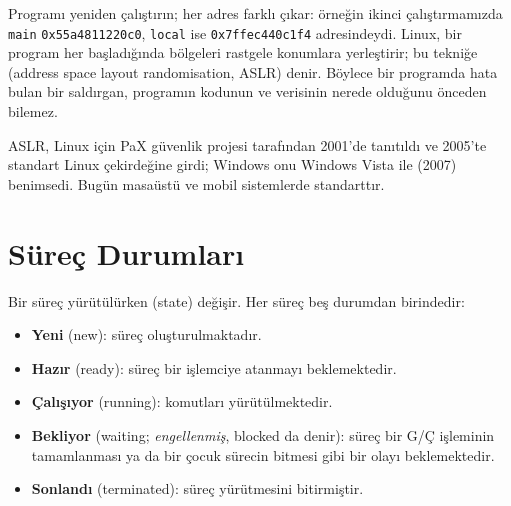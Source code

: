 Programı yeniden çalıştırın; her adres farklı çıkar: örneğin ikinci çalıştırmamızda \texttt{main} \texttt{0x55a4811220c0}, \texttt{local} ise \texttt{0x7ffec440c1f4} adresindeydi. Linux, bir program her başladığında bölgeleri rastgele konumlara yerleştirir; bu tekniğe  (address space layout randomisation, ASLR) denir. Böylece bir programda hata bulan bir saldırgan, programın kodunun ve verisinin nerede olduğunu önceden bilemez.

\begin{histnote}[ASLR]
ASLR, Linux için PaX güvenlik projesi tarafından 2001'de tanıtıldı ve 2005'te standart Linux çekirdeğine girdi; Windows onu Windows Vista ile (2007) benimsedi. Bugün masaüstü ve mobil sistemlerde standarttır.
\end{histnote}

\section{Süreç Durumları}
\label{sec:states}

Bir süreç yürütülürken  (state) değişir. Her süreç beş durumdan birindedir:

\begin{itemize}
  \item \textbf{Yeni} (new): süreç oluşturulmaktadır.
  \item \textbf{Hazır} (ready): süreç bir işlemciye atanmayı beklemektedir.
  \item \textbf{Çalışıyor} (running): komutları yürütülmektedir.
  \item \textbf{Bekliyor} (waiting; \emph{engellenmiş}, blocked da denir): süreç bir G/Ç işleminin tamamlanması ya da bir çocuk sürecin bitmesi gibi bir olayı beklemektedir.
  \item \textbf{Sonlandı} (terminated): süreç yürütmesini bitirmiştir.
\end{itemize}


